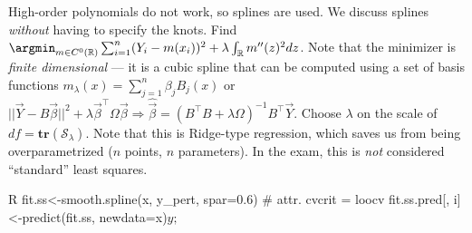 \begin{sectionbox}\nospacing{}
High-order polynomials do not work, so splines are used. We discuss splines \emph{without} having to specify the knots.
Find $\argmin_{m \in C^{0}(\mathbb{R})} \sum_{i=1}^{n}(Y_{i} - m(x_{i}))^{2} + \lambda \int_{\mathbb{R}}m''(z)^{2} dz$.
Note that the minimizer is \emph{finite dimensional} --- it is a cubic spline that can be computed using a set of basis functions $m_{\lambda}(x) = \sum_{j=1}^{n}\beta_{j}B_{j}(x)$ or $||\vec{Y} - B\vec{\beta}||^{2}+\lambda \vec{\beta}^{\top}\Omega\vec{\beta} \Rightarrow \hat{\vec{\beta}} = {(B^{\top}B + \lambda\Omega)}^{-1}B^{\top}\vec{Y}$.
Choose $\lambda$ on the scale of $df = \mathbf{tr}(\mathcal{S}_{\lambda})$.
Note that this is Ridge-type regression, which saves us from being overparametrized ($n$ points, $n$ parameters).
In the exam, this is \emph{not} considered ``standard'' least squares.
  \begin{mintlinebox}{R}
  fit.ss<-smooth.spline(x, y_pert, spar=0.6) # attr. cvcrit = loocv
  fit.ss.pred[, i]<-predict(fit.ss, newdata=x)$y ; $
  \end{mintlinebox}
\end{sectionbox}

